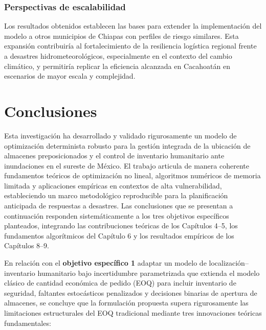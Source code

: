 \documentclass[
  spanish,
  us-letterpaper,
]{scrreprt}
\numberwithin{equation}{section}
\begin{document}
\subsection{Perspectivas de
escalabilidad}\label{perspectivas-de-escalabilidad}

Los resultados obtenidos establecen las bases para extender la
implementación del modelo a otros municipios de Chiapas con perfiles de
riesgo similares. Esta expansión contribuiría al fortalecimiento de la
resiliencia logística regional frente a desastres hidrometeorológicos,
especialmente en el contexto del cambio climático, y permitiría replicar
la eficiencia alcanzada en Cacahoatán en escenarios de mayor escala y
complejidad.


\chapter{Conclusiones}\label{conclusiones}

Esta investigación ha desarrollado y validado rigurosamente un modelo de
optimización determinista robusto para la gestión integrada de la
ubicación de almacenes preposicionados y el control de inventario
humanitario ante inundaciones en el sureste de México. El trabajo
articula de manera coherente fundamentos teóricos de optimización no
lineal, algoritmos numéricos de memoria limitada y aplicaciones
empíricas en contextos de alta vulnerabilidad, estableciendo un marco
metodológico reproducible para la planificación anticipada de respuestas
a desastres. Las conclusiones que se presentan a continuación responden
sistemáticamente a los tres objetivos específicos planteados, integrando
las contribuciones teóricas de los Capítulos 4--5, los fundamentos
algorítmicos del Capítulo 6 y los resultados empíricos de los Capítulos
8--9.

En relación con el \textbf{objetivo específico 1} adaptar un modelo de
localización--inventario humanitario bajo incertidumbre parametrizada
que extienda el modelo clásico de cantidad económica de pedido (EOQ)
para incluir inventario de seguridad, faltantes estocásticos penalizados
y decisiones binarias de apertura de almacenes, se concluye que la
formulación propuesta supera rigurosamente las limitaciones
estructurales del EOQ tradicional mediante tres innovaciones teóricas
fundamentales:
\end{document}
